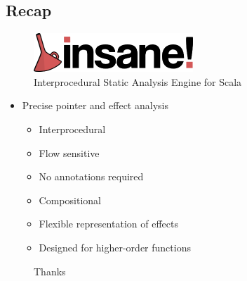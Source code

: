 \documentclass[hyperref={pdfpagelabels=false}]{beamer}
\begin{document}
\subsection{Recap}
\begin{frame}[label=overview]
    \begin{figure}[t]
        \includegraphics[width=60mm]{../../../logo.png}\\
        Interprocedural Static Analysis Engine for Scala
    \end{figure}

    \begin{itemize}
        \item Precise pointer and effect analysis
            \begin{itemize}
                \item Interprocedural
                \item Flow sensitive
                \item No annotations required
                \item Compositional
                \item Flexible representation of effects
                \item Designed for higher-order functions
            \end{itemize}
    \end{itemize}
\end{frame}
\begin{frame}[fragile]
    \begin{figure}
    \begin{center}
    Thanks
    \end{center}
    \end{figure}
\end{frame}
\end{document}
